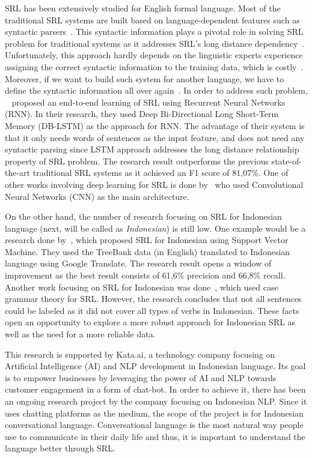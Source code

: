 SRL has been extensively studied for English formal language. Most of the traditional SRL systems are built based on language-dependent features such as syntactic parsers~\citep{gildea2002automatic, gildea2002necessity, pradhan2005semantic}. This syntactic information plays a pivotal role in solving SRL problem for traditional systems as it addresses SRL's long distance dependency~\citep{zhou2015end}. Unfortunately, this approach hardly depends on the linguistic experts experience assigning the correct syntactic information to the training data, which is costly~\citep{zhou2015end}. Moreover, if we want to build such system for another language, we have to define the syntactic information all over again~\citep{zhou2015end}. In order to address such problem, ~\cite{zhou2015end} proposed an end-to-end learning of SRL using Recurrent Neural Networks (RNN). In their research, they used Deep Bi-Directional Long Short-Term Memory (DB-LSTM) as the approach for RNN. The advantage of their system is that it only needs words of sentences as the input feature, and does not need any syntactic parsing since LSTM approach addresses the long distance relationship property of SRL problem. The research result outperforms the previous state-of-the-art traditional SRL systems as it achieved an F1 score of 81,07\%. One of other works involving deep learning for SRL is done by~\cite{collobert2011natural} who used Convolutional Neural Networks (CNN) as the main architecture.

On the other hand, the number of research focusing on SRL for Indonesian language (next, will be called as \textit{Indonesian}) is still low. One example would be a research done by~\cite{skripsidewi}, which proposed SRL for Indonesian using Support Vector Machine. They used the TreeBank data (in English) translated to Indonesian language using Google Translate. The research result opens a window of improvement as the best result consists of 61,6\% precision and 66,8\% recall. Another work focusing on SRL for Indonesian was done~\cite{skripsinur}, which used case grammar theory for SRL. However, the research concludes that not all sentences could be labeled as it did not cover all types of verbs in Indonesian. These facts open an opportunity to explore a more robust approach for Indonesian SRL as well as the need for a more reliable data.

This research is supported by Kata.ai, a technology company focusing on Artificial Intelligence (AI) and NLP development in Indonesian language. Its goal is to empower businesses by leveraging the power of AI and NLP towards customer engagement in a form of chat-bot. In order to achieve it, there has been an ongoing research project by the company focusing on Indonesian NLP. Since it uses chatting platforms as the medium, the scope of the project is for Indonesian conversational language. Conversational language is the most natural way people use to communicate in their daily life and thus, it is important to understand the language better through SRL.

